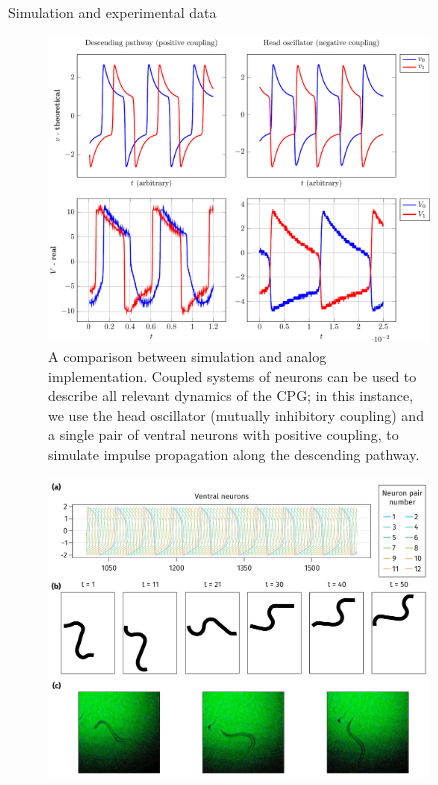 \documentclass[final]{beamer}
\newlength{\sepwidth}
\newlength{\colwidth}
\newcommand{\separatorcolumn}{\begin{column}{\sepwidth}\end{column}}
\begin{document}
\begin{frame}[t]
\begin{columns}[t]
\begin{column}{\colwidth}
\end{column}

\separatorcolumn

\begin{column}{\colwidth}

  \begin{block}{Simulation and experimental data}

    \begin{figure}
        \includegraphics[width=0.7\colwidth]{figures/anal_sim/anal_sim}
        \caption{A comparison between simulation and analog implementation.  Coupled systems of neurons can be used to describe all relevant dynamics of the CPG; in this instance, we use the head oscillator (mutually inhibitory coupling) and a single pair of ventral neurons with positive coupling, to simulate impulse propagation along the descending pathway.}
    \end{figure}

    \begin{figure}
        \includegraphics[width=0.8\colwidth]{figures/worm_neuron_dash/worm_neuron_dash}
        \caption{}
    \end{figure}
\end{block}


\end{column}
\end{columns}
\end{frame}
\end{document}
